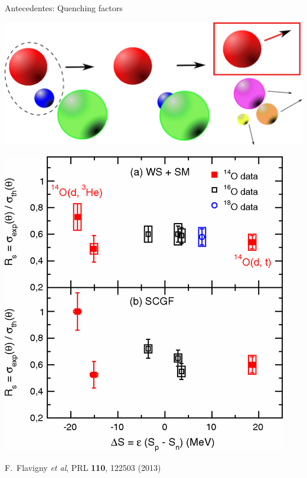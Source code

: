 \documentclass{beamer}
\begin{document}
\begin{frame}{Antecedentes: Quenching factors}
\begin{minipage}{0.45\textwidth}
\begin{center}
  \includegraphics[height=0.3\textheight,width=\textwidth, keepaspectratio]{stripping.pdf}   
    \end{center}
    \end{minipage}
    \begin{minipage}{0.45\textwidth}
    \begin{center}
    \includegraphics[height=0.4\textheight]{flavigny.png}
    
    \tiny F.~Flavigny \textit{et al}, PRL \textbf{110}, 122503 (2013)


\end{center}
\end{minipage}
\end{frame}
\end{document}
